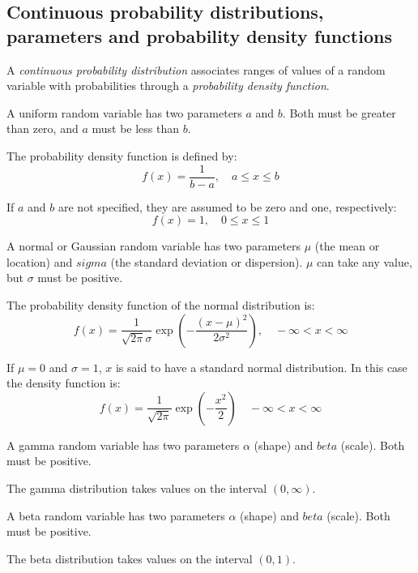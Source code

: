 \subsection{Continuous probability distributions, parameters and probability density functions}
A \textit{continuous probability distribution} associates ranges of values of a random variable with probabilities through a \textit{probability density function}.
\par\vspace{0.5 cm}
\begin{example*} 
\par\vspace{0.5 cm}
A uniform random variable has two parameters $a$ and $b$.  Both must be greater than zero, and $a$ must be less than $b$. 
\par\vspace{0.5 cm}
The probability density function is defined by:
\[
f(x) = \frac{1}{b-a},\quad a\leq x\leq b
\]
\par\vspace{0.5 cm}
If $a$ and $b$ are not specified, they are assumed to be zero and one, respectively:
\[
f(x) = 1,\quad 0\leq x\leq 1
\]
\end{example*}
\par\vspace{0.5 cm}
\begin{example*} 
\par\vspace{0.5 cm}
A normal or Gaussian random variable has two parameters $\mu$ (the mean or location) and $sigma$ (the standard deviation or dispersion).  $\mu$ can take any value, but $\sigma$ must be positive.
\par\vspace{0.5 cm}
The probability density function of the normal distribution is:
\[
f(x) = \frac{1}{\sqrt{2\pi}\sigma}\exp\left(-\frac{(x-\mu)^2}{2\sigma^2}\right),\quad -\infty < x < \infty
\]
\par\vspace{0.5 cm}
If $\mu=0$ and $\sigma=1$, $x$ is said to have a standard normal distribution.  In this case the density function is:
\[
f(x) = \frac{1}{\sqrt{2\pi}}\exp\left(-\frac{x^2}{2}\right)\quad -\infty<x<\infty
\]
\end{example*}
\par\vspace{0.5 cm}
\begin{example*} 
\par\vspace{0.5 cm}
A gamma random variable has two parameters $\alpha$ (shape) and $beta$ (scale).  Both must be positive.
\par\vspace{0.5 cm}
The gamma distribution takes values on the interval $(0,\infty)$.
\end{example*}
\par\vspace{0.5 cm}
\begin{example*} 
\par\vspace{0.5 cm}
A beta random variable has two parameters $\alpha$ (shape) and $beta$ (scale).  Both must be positive.
\par\vspace{0.5 cm}
The beta distribution takes values on the interval $(0,1)$.
\end{example*}

